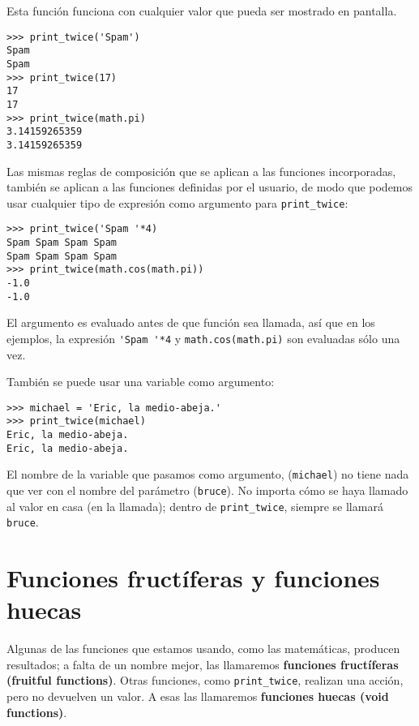 Esta función funciona con cualquier valor que pueda ser mostrado en pantalla.

\beforeverb
\begin{verbatim}
>>> print_twice('Spam')
Spam
Spam
>>> print_twice(17)
17
17
>>> print_twice(math.pi)
3.14159265359
3.14159265359
\end{verbatim}
\afterverb
%
Las mismas reglas de composición que se aplican a las funciones incorporadas, también
se aplican a las funciones definidas por el usuario, de modo que podemos usar cualquier tipo
de expresión como argumento para \verb"print_twice":


\beforeverb
\begin{verbatim}
>>> print_twice('Spam '*4)
Spam Spam Spam Spam
Spam Spam Spam Spam
>>> print_twice(math.cos(math.pi))
-1.0
-1.0
\end{verbatim}
\afterverb
%
El argumento es evaluado antes de que función sea llamada, así
que en los ejemplos, la expresión \verb"'Spam '*4" y
{\tt math.cos(math.pi)} son evaluadas sólo una vez.


También se puede usar una variable como argumento:

\beforeverb
\begin{verbatim}
>>> michael = 'Eric, la medio-abeja.'
>>> print_twice(michael)
Eric, la medio-abeja.
Eric, la medio-abeja.
\end{verbatim}
\afterverb
%
El nombre de la variable que pasamos como argumento, ({\tt michael}) no
tiene nada que ver con el nombre del parámetro ({\tt bruce}). No
importa cómo se haya llamado al valor en casa (en la llamada);
dentro de \verb"print_twice", siempre se llamará {\tt bruce}.

\section{Funciones fructíferas y funciones huecas}


Algunas de las funciones que estamos usando, como las matemáticas, producen
resultados; a falta de un nombre mejor, las llamaremos {\bf funciones fructíferas (fruitful functions)}.
Otras funciones, como \verb"print_twice", realizan una
acción, pero no devuelven un valor. A esas las llamaremos {\bf funciones
huecas (void functions)}.


